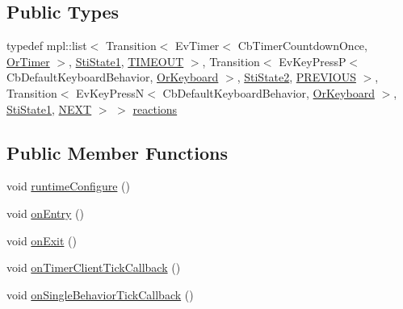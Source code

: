 \subsection*{Public Types}
\begin{DoxyCompactItemize}
\item 
typedef mpl\+::list$<$ Transition$<$ Ev\+Timer$<$ Cb\+Timer\+Countdown\+Once, \hyperlink{classsm__starcraft__ai_1_1OrTimer}{Or\+Timer} $>$, \hyperlink{structsm__starcraft__ai_1_1inner__states_1_1StiState1}{Sti\+State1}, \hyperlink{structsm__starcraft__ai_1_1inner__states_1_1StiState3_1_1TIMEOUT}{T\+I\+M\+E\+O\+UT} $>$, Transition$<$ Ev\+Key\+PressP$<$ Cb\+Default\+Keyboard\+Behavior, \hyperlink{classsm__starcraft__ai_1_1OrKeyboard}{Or\+Keyboard} $>$, \hyperlink{structsm__starcraft__ai_1_1inner__states_1_1StiState2}{Sti\+State2}, \hyperlink{structsm__starcraft__ai_1_1inner__states_1_1StiState3_1_1PREVIOUS}{P\+R\+E\+V\+I\+O\+US} $>$, Transition$<$ Ev\+Key\+PressN$<$ Cb\+Default\+Keyboard\+Behavior, \hyperlink{classsm__starcraft__ai_1_1OrKeyboard}{Or\+Keyboard} $>$, \hyperlink{structsm__starcraft__ai_1_1inner__states_1_1StiState1}{Sti\+State1}, \hyperlink{structsm__starcraft__ai_1_1inner__states_1_1StiState3_1_1NEXT}{N\+E\+XT} $>$ $>$ \hyperlink{structsm__starcraft__ai_1_1inner__states_1_1StiState3_ab7315c1c1992df9383a2fa551891d76a}{reactions}
\end{DoxyCompactItemize}
\subsection*{Public Member Functions}
\begin{DoxyCompactItemize}
\item 
void \hyperlink{structsm__starcraft__ai_1_1inner__states_1_1StiState3_a3049008678a02514a4338f9c909d85c9}{runtime\+Configure} ()
\item 
void \hyperlink{structsm__starcraft__ai_1_1inner__states_1_1StiState3_a49a8be86ee1d222346ea57d3e82e1509}{on\+Entry} ()
\item 
void \hyperlink{structsm__starcraft__ai_1_1inner__states_1_1StiState3_a517f69d2cb7ccc4ceb1ac88516f5106a}{on\+Exit} ()
\item 
void \hyperlink{structsm__starcraft__ai_1_1inner__states_1_1StiState3_a44949e1be2cf6e4eec23919278d2cd87}{on\+Timer\+Client\+Tick\+Callback} ()
\item 
void \hyperlink{structsm__starcraft__ai_1_1inner__states_1_1StiState3_aa82508ef42f1b2f95fc96b128479fe40}{on\+Single\+Behavior\+Tick\+Callback} ()
\end{DoxyCompactItemize}
